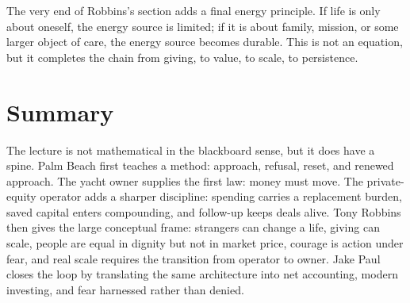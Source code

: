 The very end of Robbins's section adds a final energy principle. If life is only about oneself, the energy source is limited; if it is about family, mission, or some larger object of care, the energy source becomes durable. This is not an equation, but it completes the chain from giving, to value, to scale, to persistence.

\section{Summary}

The lecture is not mathematical in the blackboard sense, but it does have a spine. Palm Beach first teaches a method: approach, refusal, reset, and renewed approach. The yacht owner supplies the first law: money must move. The private-equity operator adds a sharper discipline: spending carries a replacement burden, saved capital enters compounding, and follow-up keeps deals alive. Tony Robbins then gives the large conceptual frame: strangers can change a life, giving can scale, people are equal in dignity but not in market price, courage is action under fear, and real scale requires the transition from operator to owner. Jake Paul closes the loop by translating the same architecture into net accounting, modern investing, and fear harnessed rather than denied.